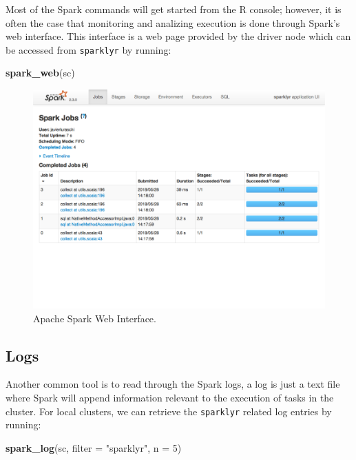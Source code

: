 \documentclass[]{book}
\newenvironment{Shaded}{\begin{snugshade}}{\end{snugshade}}
\newcommand{\DataTypeTok}[1]{\textcolor[rgb]{0.13,0.29,0.53}{#1}}
\newcommand{\DecValTok}[1]{\textcolor[rgb]{0.00,0.00,0.81}{#1}}
\newcommand{\KeywordTok}[1]{\textcolor[rgb]{0.13,0.29,0.53}{\textbf{#1}}}
\newcommand{\NormalTok}[1]{#1}
\newcommand{\StringTok}[1]{\textcolor[rgb]{0.31,0.60,0.02}{#1}}
\theoremstyle{definition}
\theoremstyle{definition}
\theoremstyle{definition}
\theoremstyle{remark}
\begin{document}
Most of the Spark commands will get started from the R console; however,
it is often the case that monitoring and analizing execution is done
through Spark's web interface. This interface is a web page provided by
the driver node which can be accessed from \texttt{sparklyr} by running:

\begin{Shaded}
\begin{Highlighting}[]
\KeywordTok{spark_web}\NormalTok{(sc)}
\end{Highlighting}
\end{Shaded}

\begin{figure}

{\centering \includegraphics[width=13.78in]{images/02-getting-started-spark-web} 

}

\caption{Apache Spark Web Interface.}\label{fig:spark-web}
\end{figure}

\hypertarget{logs}{%
\subsection{Logs}\label{logs}}

Another common tool is to read through the Spark logs, a log is just a
text file where Spark will append information relevant to the execution
of tasks in the cluster. For local clusters, we can retrieve the
\texttt{sparklyr} related log entries by running:

\begin{Shaded}
\begin{Highlighting}[]
\KeywordTok{spark_log}\NormalTok{(sc, }\DataTypeTok{filter =} \StringTok{"sparklyr"}\NormalTok{, }\DataTypeTok{n =} \DecValTok{5}\NormalTok{)}
\end{Highlighting}
\end{Shaded}
\end{document}
